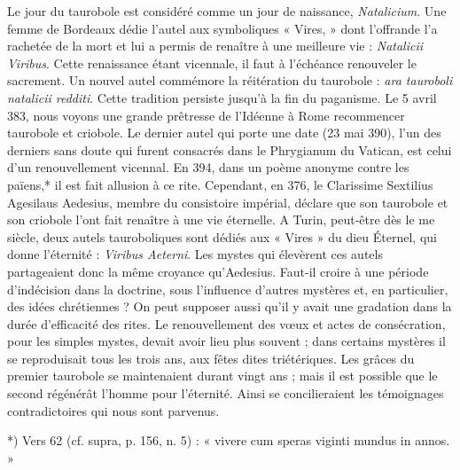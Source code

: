 \documentclass[a4paper, 11pt, oneside, polutonikogreek, french]{article}
\begin{document}
Le jour du taurobole est considéré comme un jour de naissance, \emph{Natalicium}. Une femme de Bordeaux dédie l'autel aux symboliques « Vires, » dont l'offrande l'a rachetée de la mort et lui a permis de renaître à une meilleure vie : \emph{Natalicii Viribus}. Cette renaissance étant vicennale, il faut à l'échéance renouveler le sacrement. Un nouvel autel commémore la réitération du taurobole : \emph{ara tauroboli natalicii redditi}. Cette tradition persiste jusqu'à la fin du paganisme. Le 5 avril 383, nous voyons une grande prêtresse de l'Idéenne à Rome recommencer taurobole et criobole. Le dernier autel qui porte une date (23 mai 390), l'un des derniers sans doute qui furent consacrés dans le Phrygianum du Vatican, est celui d'un renouvellement vicennal. En 394, dans un poème anonyme contre les païens,* il est fait allusion à ce rite. Cependant, en 376, le Clarissime Sextilius Agesilaus Aedesius, membre du consistoire impérial, déclare que son taurobole et son criobole l'ont fait renaître à une vie éternelle. A Turin, peut-être dès le me siècle, deux autels tauroboliques sont dédiés aux « Vires » du dieu Éternel, qui donne l'éternité : \emph{Viribus Aeterni}. Les mystes qui élevèrent ces autels partageaient donc la même croyance qu'Aedesius. Faut-il croire à une période d'indécision dans la doctrine, sous l'influence d'autres mystères et, en particulier, des idées chrétiennes ? On peut supposer aussi qu'il y avait une gradation dans la durée d'efficacité des rites. Le renouvellement des vœux et actes de consécration, pour les simples mystes, devait avoir lieu plus souvent ; dans certains mystères il se reproduisait tous les trois ans, aux fêtes dites triétériques. Les grâces du premier taurobole se maintenaient durant vingt ans ; mais il est possible que le second régénérât l'homme pour l'éternité. Ainsi se concilieraient les témoignages contradictoires qui nous sont parvenus.

*) Vers 62 (cf. supra, p. 156, n. 5) : « vivere cum speras viginti mundus in annos. »
\end{document}
